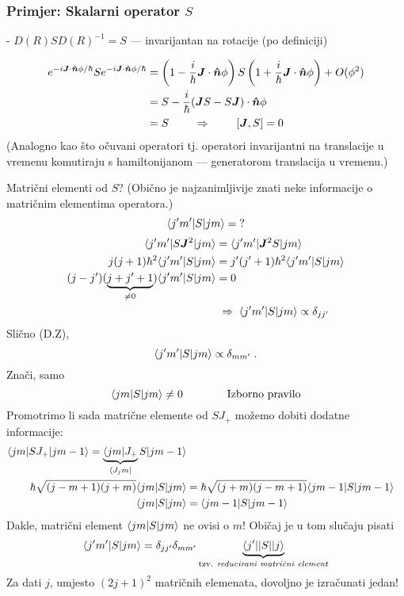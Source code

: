 \subsubsection{Primjer: Skalarni operator $S$}

 - $D(R) S D(R)^{-1} = S$ --- invarijantan na rotacije (po definiciji)

\begin{equation}
\begin{split}
 e^{-i\vec{J}\cdot\unitn \phi/\hbar} S e^{-i\vec{J}\cdot\unitn \phi/\hbar}
  &= \left(1-\frac{i}{\hbar}\vec{J}\cdot\unitn \phi\right)S
\left(1+\frac{i}{\hbar}\vec{J}\cdot\unitn \phi\right) + O(\phi^2) \\
&= S - \frac{i}{\hbar}(\vec{J}S - S\vec{J})\cdot\unitn\phi \\
&= S \qquad \imp \qquad [\vec{J}, S] = 0
\end{split}
\end{equation}
(Analogno kao što očuvani operatori tj. operatori invarijantni na
translacije u vremenu komutiraju s hamiltonijanom --- generatorom translacija
u vremenu.)

Matrični elementi od $S$? (Obično je najzanimljivije znati neke informacije
o matričnim elementima operatora.)
\begin{displaymath}
   \langle j' m' |S| j m \rangle = \text{?}
\end{displaymath}
\begin{align*}
\bra{j' m'}S\vec{J}^2 \ket{jm} &= \bra{j' m'}\vec{J}^2 S\ket{jm} \\
j(j+1)\hbar^2 \bra{j' m'}S \ket{jm} &= j'(j'+1)\hbar^2 \bra{j' m'}S \ket{jm}\\
(j-j')(\underbrace{j+j'+1}_{\neq 0})\bra{j' m'}S \ket{jm} &= 0 \\
    &\imp \bra{j' m'}S \ket{jm} \propto \delta_{jj'}
\end{align*}
Slično (D.Z), 
\begin{displaymath}
            \langle j' m' |S | jm \rangle \propto \delta_{mm'} \;.
\end{displaymath}
Znači, samo
\begin{displaymath}
               \langle j m |S | jm \rangle \neq 0 \qquad \qquad \text{Izborno pravilo}
\end{displaymath}
Promotrimo li sada matrične elemente od $SJ_+$ možemo dobiti dodatne
informacije:
\begin{align*}
\langle j m | S J_+ | j m-1 \rangle = \underbrace{\langle j m | J_+}_{\langle J_jm |}
S | j m-1 \rangle \\
\hbar \sqrt{(j-m+1)(j+m)} \langle j m |S | jm \rangle &=
\hbar \sqrt{(j+m)(j-m+1)} \langle j m-1 |S | jm-1 \rangle \\
 \langle j m |S | jm \rangle &= \langle j m-1 |S | jm-1 \rangle
\end{align*}
Dakle, matrični element $\langle j m |S | jm \rangle$ ne ovisi o $m$!
Običaj je u tom slučaju pisati
\begin{displaymath}
 \langle j' m' |S | jm \rangle = \delta_{jj'} \delta_{mm'}
 \underbrace{\langle j'  ||S| | j \rangle}_{\text{tzv. \emph{reducirani
 matrični element}}}
\end{displaymath}
Za dati $j$, umjesto $(2j+1)^2$ matričnih elemenata, dovoljno je
izračunati jedan!

